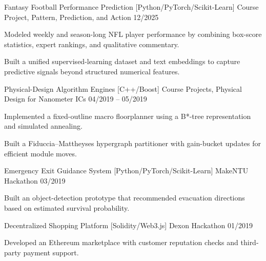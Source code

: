 \vspace{0.8mm}

\begin{cventries}

\cventry
  {Fantasy Football Performance Prediction}
  {[Python/PyTorch/Scikit-Learn]}
  {Course Project, Pattern, Prediction, and Action}
  {12/2025}
  {
    \vspace{-4.0mm}
    \begin{cvitems}
      \item {Modeled weekly and season-long NFL player performance by combining box-score statistics, expert rankings, and qualitative commentary.}
      \item {Built a unified supervised-learning dataset and text embeddings to capture predictive signals beyond structured numerical features.}
    \end{cvitems}
  }

\cventry
  {Physical-Design Algorithm Engines}
  {[C++/Boost]}
  {Course Projects, Physical Design for Nanometer ICs}
  {04/2019 -- 05/2019}
  {
    \vspace{-4.0mm}
    \begin{cvitems}
      \item {Implemented a fixed-outline macro floorplanner using a B*-tree representation and simulated annealing.}
      \item {Built a Fiduccia--Mattheyses hypergraph partitioner with gain-bucket updates for efficient module moves.}
    \end{cvitems}
  }

\cventry
  {Emergency Exit Guidance System}
  {[Python/PyTorch/Scikit-Learn]}
  {MakeNTU Hackathon}
  {03/2019}
  {
    \vspace{-4.0mm}
    \begin{cvitems}
      \item {Built an object-detection prototype that recommended evacuation directions based on estimated survival probability.}
    \end{cvitems}
  }

\cventry
  {Decentralized Shopping Platform}
  {[Solidity/Web3.js]}
  {Dexon Hackathon}
  {01/2019}
  {
    \vspace{-4.0mm}
    \begin{cvitems}
      \item {Developed an Ethereum marketplace with customer reputation checks and third-party payment support.}
    \end{cvitems}
  }


\end{cventries}

